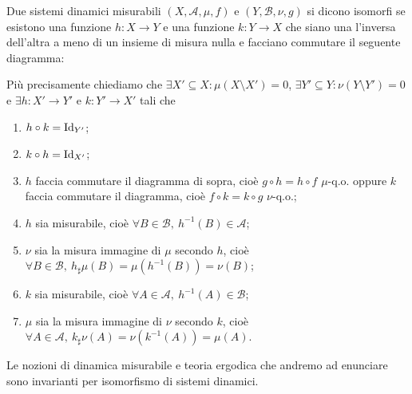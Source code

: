 \begin{definition}
    Due sistemi dinamici misurabili $ (X, \mathcal{A}, \mu, f) $ e $ (Y, \mathcal{B}, \nu, g) $ si dicono isomorfi se esistono una funzione $ h \colon X \to Y $ e una funzione $ k \colon Y \to X $ che siano una l'inversa dell'altra a meno di un insieme di misura nulla e facciano commutare il seguente diagramma:
    \begin{center}
    \end{center}
    Più precisamente chiediamo che $ \exists X' \subseteq X : \mu(X \setminus X') = 0 $, $ \exists Y' \subseteq Y : \nu(Y \setminus Y') = 0 $ e $ \exists h \colon X' \to Y' $ e $ k \colon Y' \to X' $ tali che
    \begin{enumerate}[label=(\roman*)]
        \item $ h \circ k = \mathrm{Id}_{Y'} $;
        \item $ k \circ h = \mathrm{Id}_{X'} $;
        \item $ h $ faccia commutare il diagramma di sopra, cioè $ g \circ h = h \circ f $ $ \mu $-q.o. oppure $ k $ faccia commutare il diagramma, cioè $ f \circ k = k \circ g $ $ \nu $-q.o.;
        \item $ h $ sia misurabile, cioè $ \forall B \in \mathcal{B}, \ h^{-1}(B) \in \mathcal{A} $;
        \item $ \nu $ sia la misura immagine di $ \mu $ secondo $ h $, cioè $ {\forall B \in \mathcal{B}, \ h_\sharp \mu(B) = \mu(h^{-1}(B)) = \nu(B)} $;
        \item $ k $ sia misurabile, cioè $ \forall A \in \mathcal{A}, \ h^{-1}(A) \in \mathcal{B} $;
        \item $ \mu $ sia la misura immagine di $ \nu $ secondo $ k $, cioè $ \forall A \in \mathcal{A}, \ k_\sharp \nu(A) = \nu(k^{-1}(A)) = \mu(A) $.
    \end{enumerate}
\end{definition}

\begin{oss}
    Le nozioni di dinamica misurabile e teoria ergodica che andremo ad enunciare sono invarianti per isomorfismo di sistemi dinamici.
\end{oss}

